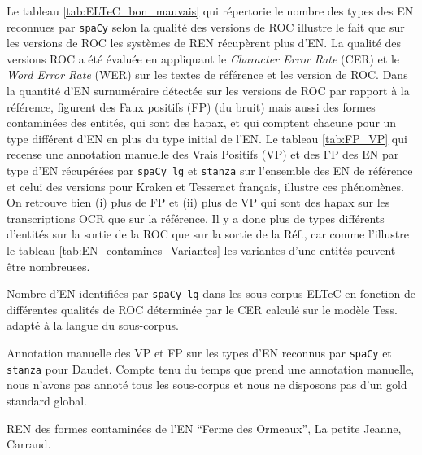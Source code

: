 Le tableau \ref{tab:ELTeC_bon_mauvais} qui répertorie le nombre des types des EN reconnues par \texttt{spaCy} selon la qualité des versions de ROC illustre le fait que sur les versions de ROC les systèmes de REN récupèrent plus d'EN. La qualité des versions ROC a été évaluée en appliquant le \textit{Character Error Rate} (CER) et le \textit{Word Error Rate} (WER) sur les textes de référence et les version de ROC.
Dans la quantité d'EN surnuméraire détectée sur les versions de ROC par rapport à la référence, figurent des Faux positifs (FP) (du bruit) mais aussi des formes contaminées des entités, qui sont des hapax, et qui comptent chacune pour un type différent d'EN en plus du type initial de l'EN. Le tableau \ref{tab:FP_VP} qui recense une annotation manuelle des Vrais Positifs (VP) et des FP des EN par type d'EN récupérées par \texttt{spaCy\_lg} et \texttt{stanza} sur l'ensemble des EN de référence et celui des versions pour Kraken et Tesseract français, illustre ces phénomènes. On retrouve bien (i) plus de FP et (ii) plus de VP qui sont des hapax sur les transcriptions OCR que sur la référence. Il y a donc plus de types différents d'entités sur la sortie de la ROC que sur la sortie de la Réf., car comme l'illustre le tableau \ref{tab:EN_contamines_Variantes} les variantes d'une entités peuvent être nombreuses. 

\begin{table}[h!]
    \centering
    \small
    
    \caption{Nombre d'EN identifiées par \texttt{spaCy\_lg} dans les sous-corpus ELTeC  en fonction de différentes qualités de ROC déterminée par le CER calculé sur le modèle Tess. adapté à la langue du sous-corpus. 
    }
    \label{tab:ELTeC_bon_mauvais}
\end{table}

\begin{table}[h!]
\small
    \centering
    
    \caption{Annotation manuelle des VP et FP sur les types d'EN reconnus par \texttt{spaCy} et \texttt{stanza} pour  Daudet. Compte tenu du temps que prend une annotation manuelle, nous n'avons pas annoté tous les sous-corpus et nous ne disposons pas d'un gold standard global.}
    \label{tab:FP_VP}
\end{table}



\begin{table}[h!]
\small
    \centering
    
    \caption{REN des formes contaminées de l'EN ``Ferme des Ormeaux'', {\normalfont La petite Jeanne}, Carraud.}
    \label{tab:EN_contamines_Variantes}
\end{table}


